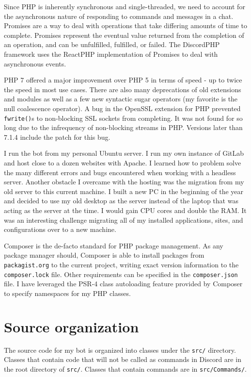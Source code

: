 \documentclass[12pt]{article} %
\begin{document}
Since PHP is inherently synchronous and single-threaded, we need to account for the asynchronous nature of responding to commands and messages in a chat. Promises are a way to deal with operations that take differing amounts of time to complete. Promises represent the eventual value returned from the completion of an operation, and can be unfulfilled, fulfilled, or failed. The DiscordPHP framework uses the ReactPHP implementation of Promises to deal with asynchronous events.

PHP 7 offered a major improvement over PHP 5 in terms of speed - up to twice the speed in most use cases. There are also many deprecations of old extensions and modules as well as a few new syntactic sugar operators (my favorite is the null coalescence operator). A bug in the OpenSSL extension for PHP prevented \verb|fwrite()|s to non-blocking SSL sockets from completing. It was not found for so long due to the infrequency of non-blocking streams in PHP. Versions later than 7.1.4 include the patch for this bug.

I run the bot from my personal Ubuntu server. I run my own instance of GitLab and host close to a dozen websites with Apache. I learned how to problem solve the many different errors and bugs encountered when working with a headless server. Another obstacle I overcame with the hosting was the migration from my old server to this current machine. I built a new PC in the beginning of the year and decided to use my old desktop as the server instead of the laptop that was acting as the server at the time. I would gain CPU cores and double the RAM. It was an interesting challenge migrating all of my installed applications, sites, and configurations over to a new machine.

Composer is the de-facto standard for PHP package management. As any package manager should, Composer is able to install packages from \verb|packagist.org| to the current project, writing exact version information to the \verb|composer.lock| file. Other requirements can be specified in the \verb|composer.json| file. I have leveraged the PSR-4 class autoloading feature provided by Composer to specify namespaces for my PHP classes.


\section{Source organization}

The source code for my bot is organized into classes under the \verb|src/| directory. Classes that contain code that will not be called as commands in Discord are in the root directory of \verb|src/|. Classes that contain commands are in \verb|src/Commands/|.
\end{document}
